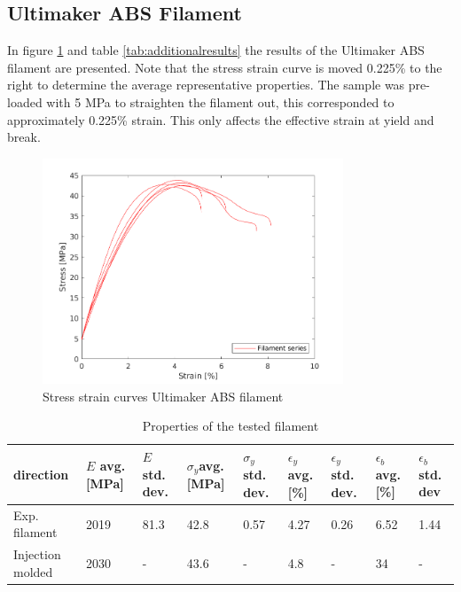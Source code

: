 \subsection{Ultimaker ABS Filament}
In figure \ref{fig:filamentresults} and table \ref{tab:additionalresults} the results of the Ultimaker ABS filament are presented. Note that the stress strain curve is moved 0.225\% to the right to determine the average representative properties. The sample was pre-loaded with 5 MPa to straighten the filament out, this corresponded to approximately 0.225\% strain. This only affects the effective strain at yield and break. 

\begin{figure}[htb]
    \centering
    \includegraphics[width=0.80\textwidth]{chapter_5_Experimentaltesting/figures/filamentdata.png}
    \caption{Stress strain curves Ultimaker ABS filament}
    \label{fig:filamentresults}
\end{figure}


\begin{table}
\caption{Properties of the tested filament}
\label{tab:filamentresults}
\begin{tabular}{ p{1.5cm}p{1cm}p{1cm}p{1cm}p{1cm}p{1cm}p{1cm}p{1cm}p{1cm}  }
 \hline
direction & $E$ avg. [MPa] & $E$ std. dev. & $\sigma_y$avg. [MPa] & $\sigma_y$ std. dev. & $\epsilon_y$ avg. [\%] & $\epsilon_y$   std. dev. & $\epsilon_b$ avg. [\%] & $\epsilon_b$   std. dev \\
 \hline
Exp. filament & 2019 & 81.3 & 42.8 & 0.57 & 4.27 & 0.26 & 6.52 & 1.44\\
Injection molded \cite{Ultimaker2018TechnicalABS} & 2030 & - & 43.6 & - & 4.8 & - & 34 & -\\
 \hline
\end{tabular}
\end{table}

